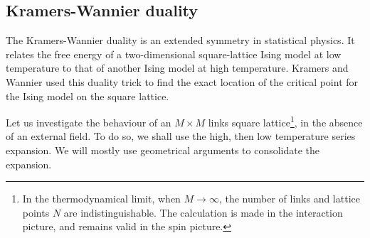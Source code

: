 \subsection{Kramers-Wannier duality}
The Kramers-Wannier duality is an extended symmetry in statistical physics. It
relates the free energy of a two-dimensional square-lattice Ising model at 
low temperature to that of another Ising model at high temperature. Kramers and
Wannier used this duality trick to find the exact location of the critical
point for the Ising model on the square lattice.

Let us investigate the behaviour of an $M\times M$ links square lattice\footnote{In
  the thermodynamical limit, when $M\rightarrow\infty$, the number of links and
  lattice points $N$ are indistinguishable. The calculation is made in the
interaction picture, and remains valid in the spin picture.}, in the absence
of an external field. To do so, we shall use the high, then low temperature
series expansion. We will mostly use geometrical arguments to consolidate the
expansion.
